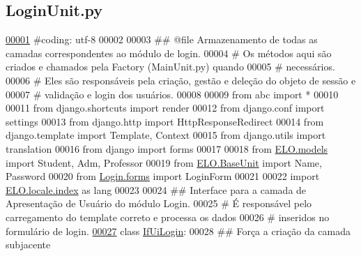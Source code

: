 \hypertarget{LoginUnit_8py_source}{}\subsection{Login\+Unit.\+py}
\label{LoginUnit_8py_source}

\begin{DoxyCode}
\hypertarget{LoginUnit_8py_source_l00001}{}\hyperlink{namespaceLogin_1_1LoginUnit}{00001} \textcolor{comment}{#coding: utf-8}
00002 
00003 \textcolor{comment}{## @file Armazenamento de todas as camadas correspondentes ao módulo de login.}
00004 \textcolor{comment}{#   Os métodos aqui são criados e chamados pela Factory (MainUnit.py) quando}
00005 \textcolor{comment}{#   necessários.}
00006 \textcolor{comment}{#   Eles são responsáveis pela criação, gestão e deleção do objeto de sessão e }
00007 \textcolor{comment}{#   validação e login dos usuários.}
00008 
00009 \textcolor{keyword}{from} abc \textcolor{keyword}{import} *
00010 
00011 \textcolor{keyword}{from} django.shortcuts \textcolor{keyword}{import} render
00012 \textcolor{keyword}{from} django.conf \textcolor{keyword}{import} settings
00013 \textcolor{keyword}{from} django.http \textcolor{keyword}{import} HttpResponseRedirect
00014 \textcolor{keyword}{from} django.template \textcolor{keyword}{import} Template, Context
00015 \textcolor{keyword}{from} django.utils \textcolor{keyword}{import} translation
00016 \textcolor{keyword}{from} django \textcolor{keyword}{import} forms
00017 
00018 \textcolor{keyword}{from} \hyperlink{namespaceELO_1_1models}{ELO.models} \textcolor{keyword}{import} Student, Adm, Professor
00019 \textcolor{keyword}{from} \hyperlink{namespaceELO_1_1BaseUnit}{ELO.BaseUnit} \textcolor{keyword}{import} Name, Password
00020 \textcolor{keyword}{from} \hyperlink{namespaceLogin_1_1forms}{Login.forms} \textcolor{keyword}{import} LoginForm
00021 
00022 \textcolor{keyword}{import} \hyperlink{namespaceELO_1_1locale_1_1index}{ELO.locale.index} \textcolor{keyword}{as} lang
00023 
00024 \textcolor{comment}{## Interface para a camada de Apresentação de Usuário do módulo Login.}
00025 \textcolor{comment}{#   É responsável pelo carregamento do template correto e processa os dados}
00026 \textcolor{comment}{#   inseridos no formulário de login.}
\hypertarget{LoginUnit_8py_source_l00027}{}\hyperlink{classLogin_1_1LoginUnit_1_1IfUiLogin}{00027} \textcolor{keyword}{class }\hyperlink{classLogin_1_1LoginUnit_1_1IfUiLogin}{IfUiLogin}:
00028     \textcolor{comment}{## Força a criação da camada subjacente}

\end{DoxyCode}
